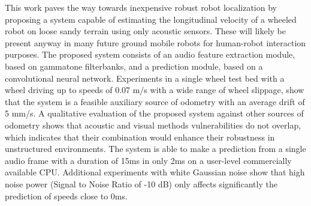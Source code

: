 This work paves the way towards inexpensive robust robot localization by
proposing a system capable of estimating the longitudinal velocity of a wheeled
robot on loose sandy terrain using only acoustic sensors. These will likely be
present anyway in many future ground mobile robots for human-robot interaction
purposes. The proposed system consists of an audio feature extraction module,
based on gammatone filterbanks, and a prediction module, based on a
convolutional neural network. Experiments in a single wheel test bed with a
wheel driving up to speeds of 0.07 m/s with a wide range of wheel slippage,
show that the system is a feasible auxiliary source of odometry with an average
drift of 5 mm/s. A qualitative evaluation of the proposed system against other
sources of odometry shows that acoustic and visual methods vulnerabilities do
not overlap, which indicates that their combination would enhance their
robustness in unstructured environments. The system is able to make a
prediction from a single audio frame with a duration of 15ms in only 2ms on a
user-level commercially available CPU. Additional experiments with white
Gaussian noise show that high noise power (Signal to Noise Ratio of -10 dB)
only affects significantly the prediction of speeds close to 0ms.